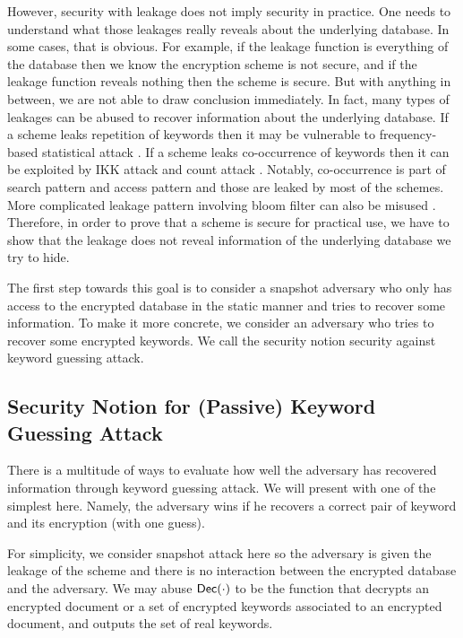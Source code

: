 However, security with leakage does not imply security in practice. One needs to understand what those leakages really reveals about the underlying database. In some cases, that is obvious. For example, if the leakage function is everything of the database then we know the encryption scheme is not secure, and if the leakage function reveals nothing then the scheme is secure. But with anything in between, we are not able to draw conclusion immediately. In fact, many types of leakages can be abused to recover information about the underlying database. If a scheme leaks repetition of keywords then it may be vulnerable to frequency-based statistical attack \cite{CCS:NavKamWri15}. If a scheme leaks co-occurrence of keywords then it can be exploited by IKK attack \cite{NDSS:IslKuzKan12} and count attack \cite{CCS:CGPR15}. Notably, co-occurrence is part of search pattern and access pattern and those are leaked by most of the schemes. More complicated leakage pattern involving bloom filter can also be misused \cite{CCS:PouWri16}. Therefore, in order to prove that a scheme is secure for practical use, we have to show that the leakage does not reveal information of the underlying database we try to hide.


The first step towards this goal is to consider a snapshot adversary who only has access to the encrypted database in the static manner and tries to recover some information. To make it more concrete, we consider an adversary who tries to recover some encrypted keywords. We call the security notion security against keyword guessing attack.




\subsection{Security Notion for (Passive) Keyword Guessing Attack}
There is a multitude of ways to evaluate how well the adversary has recovered information through keyword guessing attack. We will present with one of the simplest here. Namely, the adversary wins if he recovers a correct pair of keyword and its encryption (with one guess).

For simplicity, we consider snapshot attack here so the adversary is given the leakage of the scheme and there is no interaction between the encrypted database and the adversary. We may abuse $\mathsf{Dec}(\cdot)$ to be the function that decrypts an encrypted document or a set of encrypted keywords associated to an encrypted document, and outputs the set of real keywords.


